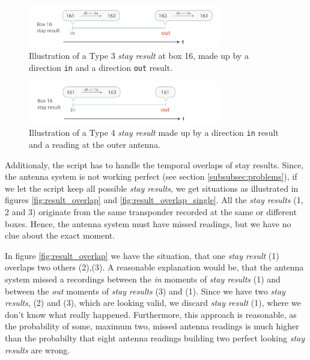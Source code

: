 \begin{figure}[htpb]
\begin{center}
  \includegraphics[width=0.75\textwidth]{assets/pdf/stay_result_type_3_schema.pdf}
  \caption[Illustration of a Type 3 \textit{stay result}]{Illustration of a Type 3 \textit{stay result} at box 16,  made up by a direction \lstinline|in| and a direction \lstinline|out| result.}
  \label{fig:type_3_stay_result}
\end{center}
\end{figure}

\begin{figure}[htpb]
\begin{center}
  \includegraphics[width=0.75\textwidth]{assets/pdf/stay_result_type_4_schema.pdf}
  \caption[Illustration of a Type 4 \textit{stay result}]{Illustration of a Type 4 \textit{stay result} made up by a direction \lstinline|in| result and a reading at the outer antenna.}
  \label{fig:type_4_stay_result}
\end{center}
\end{figure}

Additionaly, the script has to handle the temporal overlaps of stay results. Since, the antenna system is not working perfect (see section \ref{subsubsec:problems}), if we let the script keep all possible \textit{stay results}, we get situations as illustrated in figures \ref{fig:result_overlap} and \ref{fig:result_overlap_single}. All the \textit{stay results} (1, 2 and 3) originate from the same transponder recorded at the same or different boxes. Hence, the antenna system must have missed readings, but we have no clue about the exact moment.  

In figure \ref{fig:result_overlap} we have the situation, that one \textit{stay result} (1) overlaps two others (2),(3). A reasonable explanation would be, that the antenna system missed a recordings between the \textit{in} moments of \textit{stay results} (1) and between the \textit{out} moments of \textit{stay results} (3) and (1). Since we have two \textit{stay results}, (2) and (3), which are looking valid, we discard \textit{stay result} (1), where we don't know what really happened. Furthermore, this approach is reasonable, as the probability of some, maximum two, missed antenna readings is much higher than the probabilty that eight antenna readings building two perfect looking \textit{stay results} are wrong.
 
